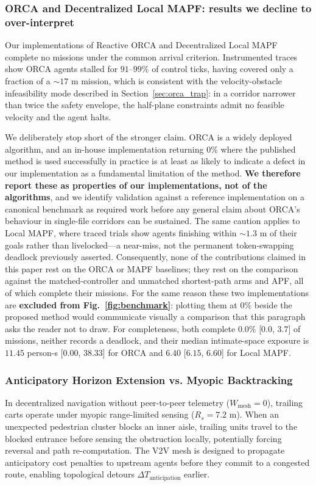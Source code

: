 \documentclass[journal]{IEEEtran}
\begin{document}
\subsubsection{ORCA and Decentralized Local MAPF: results we decline to over-interpret}
Our implementations of Reactive ORCA and Decentralized Local MAPF complete no missions under the common arrival criterion. Instrumented traces show ORCA agents stalled for $91$--$99\%$ of control ticks, having covered only a fraction of a ${\sim}17\text{ m}$ mission, which is consistent with the velocity-obstacle infeasibility mode described in Section~\ref{sec:orca_trap}: in a corridor narrower than twice the safety envelope, the half-plane constraints admit no feasible velocity and the agent halts.

We deliberately stop short of the stronger claim. ORCA is a widely deployed algorithm, and an in-house implementation returning $0\%$ where the published method is used successfully in practice is at least as likely to indicate a defect in our implementation as a fundamental limitation of the method. \textbf{We therefore report these as properties of our implementations, not of the algorithms}, and we identify validation against a reference implementation on a canonical benchmark as required work before any general claim about ORCA's behaviour in single-file corridors can be sustained. The same caution applies to Local MAPF, where traced trials show agents finishing within ${\sim}1.3\text{ m}$ of their goals rather than livelocked---a near-miss, not the permanent token-swapping deadlock previously asserted. Consequently, none of the contributions claimed in this paper rest on the ORCA or MAPF baselines; they rest on the comparison against the matched-controller and unmatched shortest-path arms and APF, all of which complete their missions. For the same reason these two implementations are \textbf{excluded from Fig.~\ref{fig:benchmark}}: plotting them at $0\%$ beside the proposed method would communicate visually a comparison that this paragraph asks the reader not to draw. For completeness, both complete $0.0\%$ [$0.0$, $3.7$] of missions, neither records a deadlock, and their median intimate-space exposure is $11.45$ person-s [$0.00$, $38.33$] for ORCA and $6.40$ [$6.15$, $6.60$] for Local MAPF.

\subsubsection{Anticipatory Horizon Extension vs. Myopic Backtracking}
In decentralized navigation without peer-to-peer telemetry ($W_{\text{mesh}}=0$), trailing carts operate under myopic range-limited sensing ($R_s = 7.2\text{ m}$). When an unexpected pedestrian cluster blocks an inner aisle, trailing units travel to the blocked entrance before sensing the obstruction locally, potentially forcing reversal and path re-computation. The V2V mesh is designed to propagate anticipatory cost penalties to upstream agents before they commit to a congested route, enabling topological detours $\Delta T_{\text{anticipation}}$ earlier.
\end{document}
